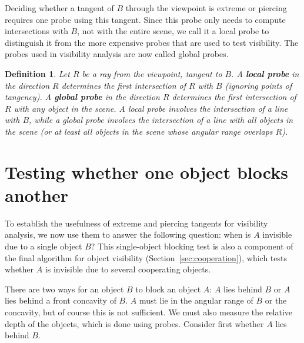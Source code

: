 \documentclass[10pt,twocolumn]{article}
\newtheorem{defn2}{Definition}
\begin{document}
Deciding whether a tangent of $B$ through the viewpoint is extreme or piercing
requires one probe using this tangent.
Since this probe only needs to compute intersections with $B$, not with the entire scene,
we call it a local probe to distinguish it from the more expensive
probes that are used to test visibility.
The probes used in visibility analysis are now called global probes.

\begin{defn2}
Let $R$ be a ray from the viewpoint, tangent to $B$.
A {\bf local probe} in the direction $R$ determines the first intersection of $R$ with $B$
(ignoring points of tangency).
A {\bf global probe} in the direction $R$ determines the first intersection of $R$ with 
any object in the scene.
A local probe involves the intersection of a line with $B$, 
while a global probe involves the intersection of a line with all objects in the scene
(or at least all objects in the scene whose angular range overlaps $R$).
\end{defn2}

\section{Testing whether one object blocks another}
\label{sec:singleblock}

To establish the usefulness of extreme and piercing tangents 
for visibility analysis,
we now use them to answer the following question:
when is $A$ invisible due to a single object $B$?
This single-object blocking test is also a component of the final algorithm 
for object visibility (Section~\ref{sec:cooperation}), which tests whether
$A$ is invisible due to several cooperating objects.

There are two ways for an object $B$ to block an object $A$: $A$ lies behind $B$ 
or $A$ lies behind a front concavity of $B$.
$A$ must lie in the angular range of $B$ or the concavity,
but of course this is not sufficient.
We must also measure the relative depth of the objects, which is done using probes.
Consider first whether $A$ lies behind $B$.
\end{document}
